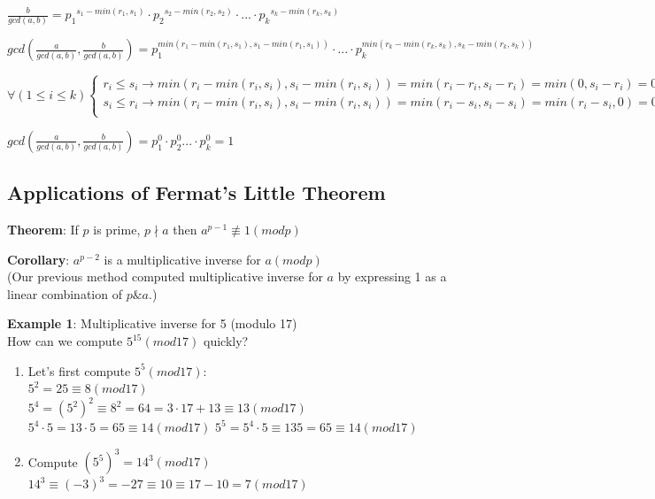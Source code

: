 \documentclass[9pt, letterpaper, oneside]{article}
\begin{document}
$\displaystyle \frac{b}{gcd(a,b)} ={p_1}^{s_1 - min(r_1, s_1)} \cdot {p_2}^{s_2 - min(r_2, s_2)} \cdot ... \cdot {p_k}^{s_k - min(r_k, s_k)}$

$\displaystyle gcd\left(\frac{a}{gcd(a,b)}, \frac{b}{gcd(a,b)}\right) = p_1^{min(r_1 - min(r_1, s_1), s_1 - min(r_1,s_1))} \cdot ... \cdot p_k^{min(r_k - min(r_k, s_k), s_k - min(r_k,s_k))}$

$\forall (1 \leq i \leq k) \begin{cases}
r_i \leq s_i \to min(r_i - min(r_i, s_i), s_i - min(r_i,s_i)) = min(r_i - r_i, s_i - r_i) = min (0, s_i -r_i) = 0\\
s_i \leq r_i \to min(r_i - min(r_i, s_i), s_i - min(r_i,s_i)) = min(r_i - s_i, s_i - s_i) = min (r_i - s_i, 0) = 0\\
\end{cases}$

$\displaystyle gcd\left(\frac{a}{gcd(a,b)}, \frac{b}{gcd(a,b)}\right) = p_1^0 \cdot p_2^0 ... \cdot p_k^0 = 1$

\subsection{Applications of Fermat's Little Theorem}

\textbf{Theorem}: If $p$ is prime, $p \nmid a$ then $a^{p-1} \not\equiv 1 (mod p)$

\textbf{Corollary}: $a^{p-2}$ is a multiplicative inverse for $a (mod p)$\\
(Our previous method computed multiplicative inverse for $a$ by expressing 1 as a linear combination of $p \& a$.)

\textbf{Example 1}: Multiplicative inverse for 5 (modulo 17)\\

How can we compute $5^{15} (mod 17)$ quickly?
\begin{enumerate}
\item Let's first compute $5^5 (mod 17)$:\\
\quad $5^2 = 25 \equiv 8 (mod 17)$\\
\quad $5^4 = (5^2)^2 \equiv 8^2 = 64 = 3 \cdot 17 + 13 \equiv 13 (mod 17)$\\
\quad $5^4 \cdot 5 = 13 \cdot 5 = 65 \equiv 14 (mod 17)$
\quad $5^5 = 5^4 \cdot 5 \equiv 135 = 65 \equiv 14 (mod 17)$

\item Compute $(5^5)^3 = 14^3 (mod 17)$\\
$14^3 \equiv (-3)^3 = -27 \equiv 10 \equiv 17 -10 = 7 (mod 17)$
\end{enumerate}
\end{document}
